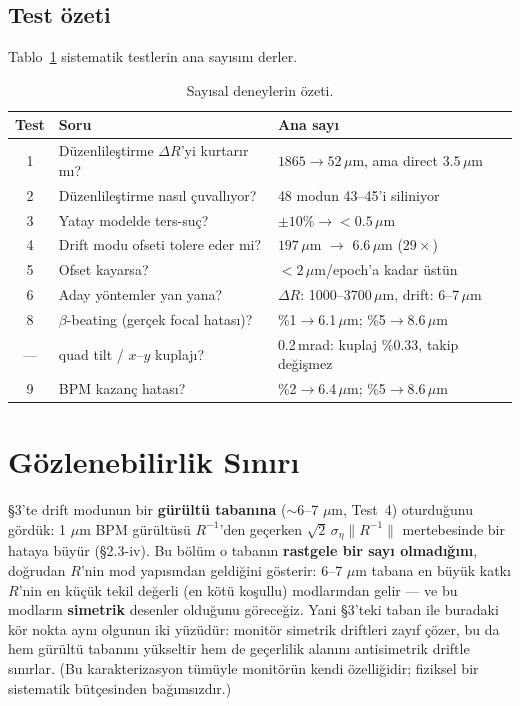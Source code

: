 \documentclass[twocolumn,a4paper,10pt]{article}
\begin{document}
\subsection{Test özeti}
Tablo~\ref{tab:summary} sistematik testlerin ana sayısını derler.

\begin{table}[tb]
\centering
\caption{Sayısal deneylerin özeti.}
\label{tab:summary}
\begin{tabular}{@{}cll@{}}
\toprule
Test & Soru & Ana sayı \\
\midrule
1 & Düzenlileştirme $\Delta R$'yi kurtarır mı? & $1865\to52\,\mu$m, ama direct $3.5\,\mu$m \\
2 & Düzenlileştirme nasıl çuvallıyor? & 48 modun 43--45'i siliniyor \\
3 & Yatay modelde ters-suç? & $\pm10\%\to{<}0.5\,\mu$m \\
4 & Drift modu ofseti tolere eder mi? & $197\,\mu$m $\to$ $6.6\,\mu$m ($29\times$) \\
5 & Ofset kayarsa? & $<2\,\mu$m/epoch'a kadar üstün \\
6 & Aday yöntemler yan yana? & $\Delta R$: 1000--3700\,$\mu$m, drift: 6--7\,$\mu$m \\
8 & $\beta$-beating (gerçek focal hatası)? & \%1$\to$6.1\,$\mu$m; \%5$\to$8.6\,$\mu$m \\
--- & quad tilt / $x$--$y$ kuplajı? & 0.2\,mrad: kuplaj \%0.33, takip değişmez \\
9 & BPM kazanç hatası? & \%2$\to$6.4\,$\mu$m; \%5$\to$8.6\,$\mu$m \\
\bottomrule
\end{tabular}
\end{table}

\section{Gözlenebilirlik Sınırı}
\S3'te drift modunun bir \textbf{gürültü tabanına} ($\sim6$--7 $\mu$m, Test~4)
oturduğunu gördük: 1 $\mu$m BPM gürültüsü $R^{-1}$'den geçerken
$\sqrt2\,\sigma_\eta\|R^{-1}\|$ mertebesinde bir hataya büyür (\S2.3-iv). Bu
bölüm o tabanın \textbf{rastgele bir sayı olmadığını}, doğrudan $R$'nin mod
yapısından geldiğini gösterir: 6--7 $\mu$m tabana en büyük katkı $R$'nin en küçük
tekil değerli (en kötü koşullu) modlarından gelir --- ve bu modların
\textbf{simetrik} desenler olduğunu göreceğiz. Yani \S3'teki taban ile
buradaki kör nokta aynı olgunun iki yüzüdür: monitör simetrik driftleri zayıf
çözer, bu da hem gürültü tabanını yükseltir hem de geçerlilik alanını
antisimetrik driftle sınırlar. (Bu karakterizasyon tümüyle monitörün kendi
özelliğidir; fiziksel bir sistematik bütçesinden bağımsızdır.)
\end{document}
